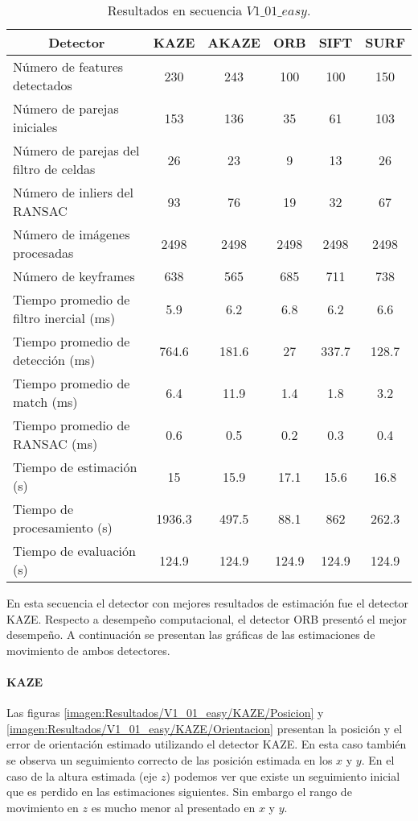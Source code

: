 \begin{table}[H]
	\caption{Resultados en secuencia $V1\_ 01\_ easy$.}
	\begin{tabular}{|l|c|c|c|c|c|}
		\hline
		\multicolumn{1}{|c|}{\textbf{Detector}} & \textbf{KAZE} & \textbf{AKAZE} & \textbf{ORB} & \textbf{SIFT} & \textbf{SURF} \\ \hline
		Número de features detectados & 230 & 243 & 100 & 100 & 150 \\ \hline
		Número de parejas iniciales & 153 & 136 & 35 & 61 & 103 \\ \hline
		Número de parejas del filtro de celdas & 26 & 23 & 9 & 13 & 26 \\ \hline
		Número de inliers del RANSAC & 93 & 76 & 19 & 32 & 67 \\ \hline
		Número de imágenes procesadas & 2498 & 2498 & 2498 & 2498 & 2498 \\ \hline
		Número de keyframes & 638 & 565 & 685 & 711 & 738 \\ \hline
		Tiempo promedio de filtro inercial (ms) & 5.9 & 6.2 & 6.8 & 6.2 & 6.6 \\ \hline
		Tiempo promedio de detección  (ms) & 764.6 & 181.6 & 27 & 337.7 & 128.7 \\ \hline
		Tiempo promedio de match (ms) & 6.4 & 11.9 & 1.4 & 1.8 & 3.2 \\ \hline
		Tiempo promedio de RANSAC (ms) & 0.6 & 0.5 & 0.2 & 0.3 & 0.4 \\ \hline
		Tiempo de estimación (s) & 15 & 15.9 & 17.1 & 15.6 & 16.8 \\ \hline
		Tiempo de  procesamiento (s) & 1936.3 & 497.5 & 88.1 & 862 & 262.3 \\ \hline
		Tiempo de evaluación (s) & 124.9 & 124.9 & 124.9 & 124.9 & 124.9 \\ \hline
	\end{tabular}
	\label{Tabla/Resultados/V1_01_easy}
\end{table}


En esta secuencia el detector con mejores resultados de estimación fue el detector KAZE. Respecto a desempeño computacional, el detector ORB presentó  el mejor desempeño. A continuación se presentan las gráficas de las estimaciones de movimiento de ambos detectores.
\paragraph {KAZE}

Las figuras \ref{imagen:Resultados/V1_01_easy/KAZE/Posicion}  y \ref{imagen:Resultados/V1_01_easy/KAZE/Orientacion} presentan la posición y el error de orientación estimado utilizando el detector KAZE. En esta caso también se observa un seguimiento correcto de las posición estimada en los $x$ y $y$. En el caso de la altura estimada (eje $z$) podemos ver que existe un seguimiento inicial que es perdido en las estimaciones siguientes. Sin embargo el rango de movimiento en $z$ es mucho menor al presentado en $x$ y $y$.

